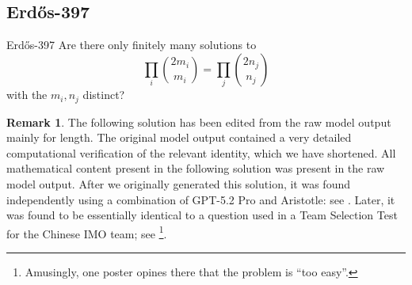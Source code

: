 \documentclass{article}
\theoremstyle{plain}
\theoremstyle{definition}
\newtheorem{remark}{Remark}[section]
\begin{document}
\subsection{Erdős-397}

\begin{problem}{Erdős-397 \cite{ErGr80}}
    Are there only finitely many solutions to\[\prod_i \binom{2m_i}{m_i}=\prod_j \binom{2n_j}{n_j}\]with the $m_i,n_j$ distinct?
\end{problem}

\begin{remark}\label{rem:397}
    The following solution has been edited from the raw model output mainly for length. The original model output contained a very detailed computational verification of the relevant identity, which we have shortened. All mathematical content present in the following solution was present in the raw model output. After we originally generated this solution, it was found independently using a combination of GPT-5.2 Pro and Aristotle: see \cite{tao2026erdosai}. Later, it was found to be essentially identical to a question used in a Team Selection Test for the Chinese IMO team; see \cite{AoPS12}\footnote{Amusingly, one poster opines there that the problem is ``too easy''.}.
\end{remark}
\end{document}
